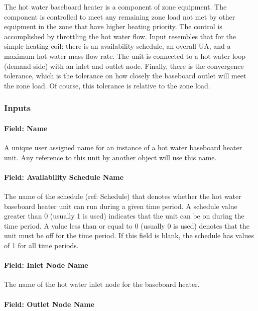 The hot water baseboard heater is a component of zone equipment. The component is controlled to meet any remaining zone load not met by other equipment in the zone that have higher heating priority. The control is accomplished by throttling the hot water flow. Input resembles that for the simple heating coil: there is an availability schedule, an overall UA, and a maximum hot water mass flow rate. The unit is connected to a hot water loop (demand side) with an inlet and outlet node. Finally, there is the convergence tolerance, which is the tolerance on how closely the baseboard outlet will meet the zone load. Of course, this tolerance is relative to the zone load.

\subsubsection{Inputs}\label{inputs-3-028}

\paragraph{Field: Name}\label{field-name-3-025}

A unique user assigned name for an instance of a hot water baseboard heater unit. Any reference to this unit by another object will use this name.

\paragraph{Field: Availability Schedule Name}\label{field-availability-schedule-name-3-005}

The name of the schedule (ref: Schedule) that denotes whether the hot water baseboard heater unit can run during a given time period. A schedule value greater than 0 (usually 1 is used) indicates that the unit can be on during the time period. A value less than or equal to 0 (usually 0 is used) denotes that the unit must be off for the time period. If this field is blank, the schedule has values of 1 for all time periods.

\paragraph{Field: Inlet Node Name}\label{field-inlet-node-name-2-002}

The name of the hot water inlet node for the baseboard heater.

\paragraph{Field: Outlet Node Name}\label{field-outlet-node-name-2-002}

